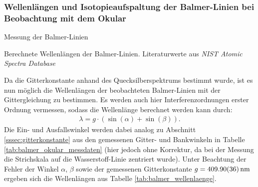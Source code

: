\documentclass[11pt, a4paper]{article}
\numberwithin{equation}{section}
\begin{document}
\subsubsection{Wellenlängen und Isotopieaufspaltung der Balmer-Linien bei Beobachtung mit dem Okular}
\label{sssec:balmer_okular_aufspaltung}
\begin{table}[h]
	\centering
	
	\caption{Messung der Balmer-Linien}
	\label{tab:balmer_okular_messdaten}
\end{table}
\begin{table}[h]
	\centering
	
	\caption{Berechnete Wellenlängen der Balmer-Linien. Literaturwerte aus \emph{NIST Atomic Spectra Database} \cite{NISTSpectra}}
	\label{tab:balmer_wellenlaenge}
\end{table}
Da die Gitterkonstante anhand des Quecksilberspektrums bestimmt wurde, ist es nun möglich die Wellenlängen der beobachteten Balmer-Linien mit der Gittergleichung zu bestimmen.
Es werden auch hier Interferenzordnungen erster Ordnung vermessen, sodass die Wellenlänge berechnet werden kann durch:
\begin{align*}
  \lambda = g \cdot ( \sin(\alpha) + \sin(\beta)) \text{.}
\end{align*}
Die Ein- und Ausfallswinkel werden dabei analog zu Abschnitt \ref{sssec:gitterkonstante} aus den gemessenen Gitter- und Bankwinkeln in Tabelle \ref{tab:balmer_okular_messdaten} (hier jedoch ohne Korrektur, da bei der Messung die Strichskala auf die Wasserstoff-Linie zentriert wurde).
Unter Beachtung der Fehler der Winkel $\alpha$, $\beta$ sowie der gemessenen Gitterkonstante $g = \SI{409.90 +- 0.36}{\nano\metre}$ ergeben sich die Wellenlängen aus Tabelle \ref{tab:balmer_wellenlaenge}.
\end{document}
